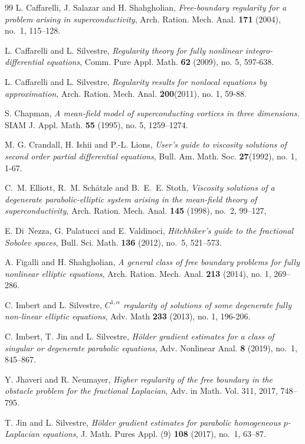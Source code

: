 \documentclass[reqno,11pt]{amsart}
\numberwithin{equation}{section}
\numberwithin{equation}{section}
\begin{document}
\begin{thebibliography}{99}
 L. Caffarelli, J. Salazar and H. Shahgholian, \textit{Free-boundary regularity for a problem arising in superconductivity}, Arch. Ration. Mech. Anal. {\bf 171} (2004), no.~1, 115--128.

 L. Caffarelli and L. Silvestre,
\textit{Regularity theory for fully nonlinear integro-differential equations}, Comm. Pure Appl. Math. {\bf 62} (2009), no. 5, 597-638.

 L. Caffarelli and L. Silvestre,
\textit{Regularity results for nonlocal equations by approximation}, Arch. Ration. Mech. Anal. {\bf 200}(2011), no. 1, 59-88.

 S. Chapman, {\it A mean-field model of superconducting vortices in three dimensions.}
SIAM J. Appl. Math. {\bf 55} (1995), no. 5, 1259--1274.

 M. G. Crandall, H. Ishii and P.-L. Lions, \textit{User’s guide to viscosity solutions of second order partial differential equations}, Bull. Am. Math. Soc. {\bf 27}(1992), no. 1, 1-67.

 C.~M. Elliott, R.~M. Sch\"atzle and B.~E.~E. Stoth, \textit{Viscosity solutions of a degenerate parabolic-elliptic system arising in the mean-field theory of superconductivity}, Arch. Ration. Mech. Anal. {\bf 145} (1998), no.~2, 99--127,

 E. Di~Nezza, G. Palatucci and E. Valdinoci, \textit{Hitchhiker's guide to the fractional Sobolev spaces}, Bull. Sci. Math. {\bf 136} (2012), no.~5, 521--573.

 A. Figalli and H. Shahgholian, \textit{A general class of free boundary problems for fully nonlinear elliptic equations}, Arch. Ration. Mech. Anal. {\bf 213} (2014), no. 1, 269--286.

 C. Imbert and L. Silvestre, \textit{$C^{1,\alpha}$ regularity of solutions of some degenerate fully non-linear elliptic equations}, Adv. Math {\bf 233} (2013), no. 1, 196-206.

 C. Imbert, T. Jin and L. Silvestre, \textit{H\"older gradient estimates for a class of singular or degenerate parabolic equations}, Adv. Nonlinear Anal. {\bf 8} (2019), no.~1, 845--867.

 Y. Jhaveri and R. Neumayer, \textit{Higher regularity of the free boundary in the obstacle problem for the fractional Laplacian}, Adv. in Math. Vol. 311, 2017, 748--795.

 T. Jin and L. Silvestre, \textit{H\"older gradient estimates for parabolic homogeneous $p$-Laplacian equations}, J. Math. Pures Appl. (9) {\bf 108} (2017), no.~1, 63--87.


\end{thebibliography}
\end{document}
